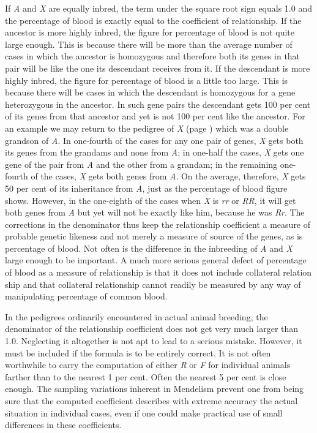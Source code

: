 \noindent
If \textit{A} and \textit{X} are equally inbred, the term under the square root sign
equals 1.0 and the percentage of blood is exactly equal to the coefficient
of relationship. If the ancestor is more highly inbred, the figure for percentage
of blood is not quite large enough. This is because there will be
more than the average number of cases in which the ancestor is homozygous
and therefore both its genes in that pair will be like the one its
descendant receives from it. If the descendant is more highly inbred, the
figure for percentage of blood is a little too large. This is because there
will be cases in which the descendant is homozygous for a gene heterozygous
in the ancestor. In such gene pairs the descendant gets 100 per
cent of its genes from that ancestor and yet is not 100 per cent like the
ancestor. For an example we may return to the pedigree of \textit{X}
(page \pageref{fig:Lush_Figure_Page-273})
which was a double grandson of \textit{A}. In one-fourth of the cases for any
one pair of genes, \textit{X} gets both its genes from the grandams and none
from \textit{A}; in one-half the cases, \textit{X} gets one gene of the pair from \textit{A} and
the other from a grandam; in the remaining one-fourth of the cases, \textit{X}
gets both genes from \textit{A}. On the average, therefore, \textit{X} gets 50 per cent of
its inheritance from \textit{A}, just as the percentage of blood figure shows.
However, in the one-eighth of the cases when \textit{X} is \textit{rr} or \textit{RR}, it will get
both genes from \textit{A} but yet will not be exactly like him, because he was
\textit{Rr}. The corrections in the denominator thus keep the relationship
coefficient a measure of probable genetic likeness and not merely a
measure of source of the genes, as is percentage of blood. Not often is
the difference in the inbreeding of \textit{A} and \textit{X} large enough to be important.
A much more serious general defect of percentage of blood as a
measure of relationship is that it does not include collateral relation ship
and that collateral relationship cannot readily be measured by any
way of manipulating percentage of common blood.

In the pedigrees ordinarily encountered in actual animal breeding,
the denominator of the relationship coefficient does not get very much
larger than 1.0. Neglecting it altogether is not apt to lead to a serious
mistake. However, it must be included if the formula is to be entirely
correct. It is not often worthwhile to carry the computation of either
\textit{R} or \textit{F} for individual animals farther than to the nearest 1 per cent.
Often the nearest 5 per cent is close enough. The sampling variations
inherent in Mendelism prevent one from being sure that the computed
coefficient describes with extreme accuracy the actual situation in individual
cases, even if one could make practical use of small differences
in these coefficients.

